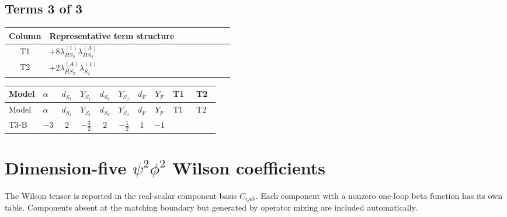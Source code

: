 \documentclass[8pt]{article}
\begin{document}
\begin{landscape}
\subsection*{Terms 3 of 3}
\begin{center}
\begin{tabular}{@{}c >{\raggedright\arraybackslash}p{0.82\linewidth}@{}}
\toprule
Column & Representative term structure \\
\midrule
T1 & \(\displaystyle +8 {\lambda_{HS_2}^{(1)}} {\lambda_{HS_2}^{(A)}}\) \\
\midrule
T2 & \(\displaystyle +2 {\lambda_{HS_2}^{(A)}} {\lambda_{S_2}^{(1)}}\) \\
\midrule
\bottomrule
\end{tabular}
\end{center}
\smallskip
\tiny
\begin{longtable}{@{}llcccccc >{\raggedright\arraybackslash}p{0.21\linewidth} >{\raggedright\arraybackslash}p{0.21\linewidth}@{}}
\toprule
Model & $\alpha$ & $d_{S_1}$ & $Y_{S_1}$ & $d_{S_2}$ & $Y_{S_2}$ & $d_F$ & $Y_F$ & T1 & T2 \\
\midrule
\endfirsthead
\toprule
Model & $\alpha$ & $d_{S_1}$ & $Y_{S_1}$ & $d_{S_2}$ & $Y_{S_2}$ & $d_F$ & $Y_F$ & T1 & T2 \\
\midrule
\endhead
T3-B & $-3$ & $2$ & $-\frac{3}{2}$ & $2$ & $-\frac{1}{2}$ & $1$ & $-1$ & \scriptsize\adjustbox{max width=\linewidth}{$\begin{gathered} +8 {\lambda_{HS_2}^{(1)}} {\lambda_{HS_2}^{(A)}}\end{gathered}$} & \scriptsize\adjustbox{max width=\linewidth}{$\begin{gathered} +2 {\lambda_{HS_2}^{(A)}} {\lambda_{S_2}^{(1)}}\end{gathered}$} \\
\midrule
\bottomrule
\end{longtable}
\clearpage
\section*{Dimension-five $\psi^2\phi^2$ Wilson coefficients}
The Wilson tensor is reported in the real-scalar component basis $C_{ijab}$. Each component with a nonzero one-loop beta function has its own table. Components absent at the matching boundary but generated by operator mixing are included automatically.

\end{landscape}
\end{document}
